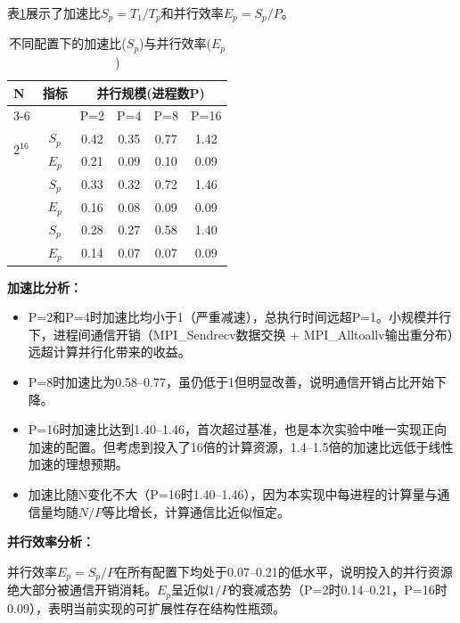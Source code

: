 \documentclass{SYSUReport}
\begin{document}
表\ref{tab:speedup}展示了加速比$S_p = T_1 / T_p$和并行效率$E_p = S_p / P$。

\begin{table}[h!]
\centering
\caption{不同配置下的加速比($S_p$)与并行效率($E_p$)}
\label{tab:speedup}
\begin{tabular}{@{}lccccc@{}}
\toprule
\multirow{2}{*}{N} & 指标 & \multicolumn{4}{c}{并行规模(进程数P)} \\
\cmidrule(l){3-6}
                    &      & P=2 & P=4 & P=8 & P=16 \\ \midrule
\multirow{2}{*}{$2^{16}$}
                    & $S_p$ & 0.42 & 0.35 & 0.77 & 1.42 \\
                    & $E_p$ & 0.21 & 0.09 & 0.10 & 0.09 \\ \addlinespace
\multirow{2}{*}{$2^{18}$}
                    & $S_p$ & 0.33 & 0.32 & 0.72 & 1.46 \\
                    & $E_p$ & 0.16 & 0.08 & 0.09 & 0.09 \\ \addlinespace
\multirow{2}{*}{$2^{20}$}
                    & $S_p$ & 0.28 & 0.27 & 0.58 & 1.40 \\
                    & $E_p$ & 0.14 & 0.07 & 0.07 & 0.09 \\
\bottomrule
\end{tabular}
\end{table}

\textbf{加速比分析：}

\begin{itemize}
    \item P=2和P=4时加速比均小于1（严重减速），总执行时间远超P=1。小规模并行下，进程间通信开销（MPI\_Sendrecv数据交换 + MPI\_Alltoallv输出重分布）远超计算并行化带来的收益。
    \item P=8时加速比为0.58--0.77，虽仍低于1但明显改善，说明通信开销占比开始下降。
    \item P=16时加速比达到1.40--1.46，首次超过基准，也是本次实验中唯一实现正向加速的配置。但考虑到投入了16倍的计算资源，1.4--1.5倍的加速比远低于线性加速的理想预期。
    \item 加速比随N变化不大（P=16时1.40--1.46），因为本实现中每进程的计算量与通信量均随$N/P$等比增长，计算通信比近似恒定。
\end{itemize}

\textbf{并行效率分析：}

并行效率$E_p = S_p / P$在所有配置下均处于0.07--0.21的低水平，说明投入的并行资源绝大部分被通信开销消耗。$E_p$呈近似$1/P$的衰减态势（P=2时0.14--0.21，P=16时0.09），表明当前实现的可扩展性存在结构性瓶颈。
\end{document}
